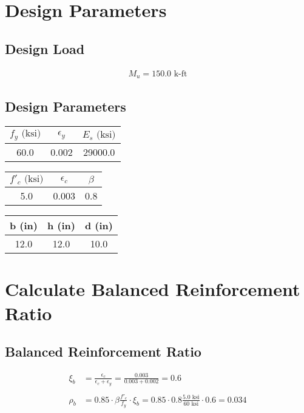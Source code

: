 \documentclass{article}%
\begin{document}
%
\normalsize%
\section{Design Parameters}%
\label{sec:Design Parameters}%
\subsection{Design Load}%
\label{subsec:Design Load}%
\begin{align*} M_u = 150.0 \text{ k-ft}\end{align*}

%
\subsection{Design Parameters}%
\label{subsec:Design Parameters}%
\begin{center}
%
\begin{tabular}{ccc}
\toprule
 $f_y\text{ (ksi)}$ &  $\epsilon_y$ &  $E_s\text{ (ksi)}$ \\
\midrule
               60.0 &         0.002 &             29000.0 \\
\bottomrule
\end{tabular}
%
\end{center}%
\begin{center}
%
\begin{tabular}{ccc}
\toprule
 $f'_c\text{ (ksi)}$ &  $\epsilon_c$ &  $\beta$ \\
\midrule
                 5.0 &         0.003 &      0.8 \\
\bottomrule
\end{tabular}
%
\end{center}%
\begin{center}
%
\begin{tabular}{ccc}
\toprule
 b (in) &  h (in) &  d (in) \\
\midrule
   12.0 &    12.0 &    10.0 \\
\bottomrule
\end{tabular}
%
\end{center}

%
\section{Calculate Balanced Reinforcement Ratio}%
\label{sec:Calculate Balanced Reinforcement Ratio}%
\subsection{Balanced Reinforcement Ratio}%
\label{subsec:Balanced Reinforcement Ratio}%
\begin{align*}\xi_{b} &= \frac{\epsilon_c}{\epsilon_c + \epsilon_y} =\frac{0.003}{0.003 + 0.002} = 0.6 \\\\ \rho_{b} &= 0.85 \cdot \beta \frac{f'_c}{f_y} \cdot \xi_b= 0.85 \cdot 0.8 \frac{5.0 \text{ ksi}}{60 \text{ ksi}} \cdot 0.6 = 0.034 \end{align*}
\end{document}
